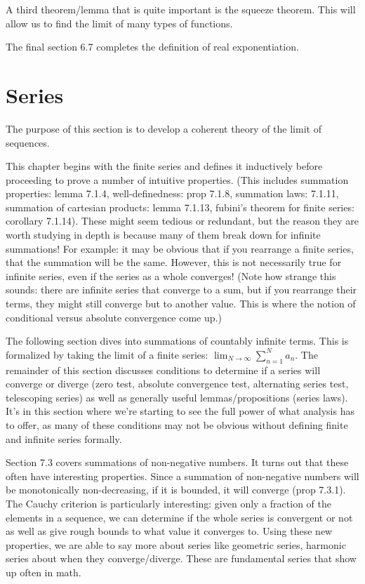 \documentclass[answers,12pt]{exam}
\begin{document}
A third theorem/lemma that is quite important is the squeeze theorem.
This will allow us to find the limit of many types of functions.

The final section 6.7 completes the definition of real exponentiation.

\section{Series}
The purpose of this section is to develop a coherent theory of the limit of sequences.

This chapter begins with the finite series and defines it inductively before proceeding to prove a number of intuitive properties.
(This includes summation properties: lemma 7.1.4, well-definedness: prop 7.1.8, summation laws: 7.1.11, summation of cartesian products: lemma 7.1.13, fubini's theorem for finite series: corollary 7.1.14).
These might seem tedious or redundant, but the reason they are worth studying in depth is because many of them break down for infinite summations!
For example: it may be obvious that if you rearrange a finite series, that the summation will be the same.
However, this is not necessarily true for infinite series, even if the series as a whole converges!
(Note how strange this sounds: there are infinite series that converge to a sum, but if you rearrange their terms, they might still converge but to another value.
This is where the notion of conditional versus absolute convergence come up.)

The following section dives into summations of countably infinite terms.
This is formalized by taking the limit of a finite series: $\lim_{N \to \infty} \sum_{n=1}^N a_n$.
The remainder of this section discusses conditions to determine if a series will converge or diverge (zero test, absolute convergence test, alternating series test, telescoping series) as well as generally useful lemmas/propositions (series laws).
It's in this section where we're starting to see the full power of what analysis has to offer, as many of these conditions may not be obvious without defining finite and infinite series formally.

Section 7.3 covers summations of non-negative numbers.
It turns out that these often have interesting properties.
Since a summation of non-negative numbers will be monotonically non-decreasing, if it is bounded, it will converge (prop 7.3.1).
The Cauchy criterion is particularly interesting: given only a fraction of the elements in a sequence, we can determine if the whole series is convergent or not as well as give rough bounds to what value it converges to.
Using these new properties, we are able to say more about series like geometric series, harmonic series about when they converge/diverge.
These are fundamental series that show up often in math.
\end{document}
